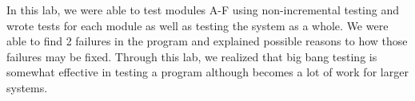 \documentclass[12pt, letterpaper, titlepage]{article}
\begin{document}
In this lab, we were able to test modules A-F using non-incremental testing and wrote tests for each module as well as testing the system as a whole. We were able to find 2 failures in the program and explained possible reasons to how those failures may be fixed. Through this lab, we realized that big bang testing is somewhat effective in testing a program although becomes a lot of work for larger systems.
\end{document}
